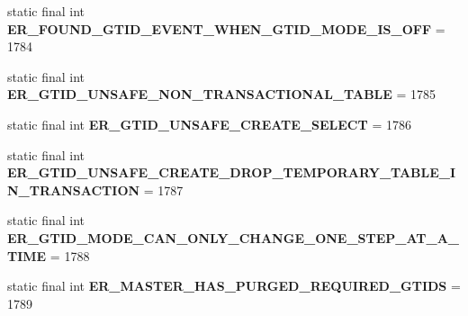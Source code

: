 \begin{DoxyCompactItemize}
\item 
\mbox{\label{classcom_1_1mysql_1_1jdbc_1_1_mysql_error_numbers_ac7d387bee25693bfcc63510f4c38737a}} 
static final int {\bfseries E\+R\+\_\+\+F\+O\+U\+N\+D\+\_\+\+G\+T\+I\+D\+\_\+\+E\+V\+E\+N\+T\+\_\+\+W\+H\+E\+N\+\_\+\+G\+T\+I\+D\+\_\+\+M\+O\+D\+E\+\_\+\+I\+S\+\_\+\+O\+FF} = 1784
\item 
\mbox{\label{classcom_1_1mysql_1_1jdbc_1_1_mysql_error_numbers_a2e00e75417d2bb26513adaedd9f455ad}} 
static final int {\bfseries E\+R\+\_\+\+G\+T\+I\+D\+\_\+\+U\+N\+S\+A\+F\+E\+\_\+\+N\+O\+N\+\_\+\+T\+R\+A\+N\+S\+A\+C\+T\+I\+O\+N\+A\+L\+\_\+\+T\+A\+B\+LE} = 1785
\item 
\mbox{\label{classcom_1_1mysql_1_1jdbc_1_1_mysql_error_numbers_a946c50067b4ee62c8fbe7a09bc0f490a}} 
static final int {\bfseries E\+R\+\_\+\+G\+T\+I\+D\+\_\+\+U\+N\+S\+A\+F\+E\+\_\+\+C\+R\+E\+A\+T\+E\+\_\+\+S\+E\+L\+E\+CT} = 1786
\item 
\mbox{\label{classcom_1_1mysql_1_1jdbc_1_1_mysql_error_numbers_a077d74fb9a1b9d97acba8d29aa896537}} 
static final int {\bfseries E\+R\+\_\+\+G\+T\+I\+D\+\_\+\+U\+N\+S\+A\+F\+E\+\_\+\+C\+R\+E\+A\+T\+E\+\_\+\+D\+R\+O\+P\+\_\+\+T\+E\+M\+P\+O\+R\+A\+R\+Y\+\_\+\+T\+A\+B\+L\+E\+\_\+\+I\+N\+\_\+\+T\+R\+A\+N\+S\+A\+C\+T\+I\+ON} = 1787
\item 
\mbox{\label{classcom_1_1mysql_1_1jdbc_1_1_mysql_error_numbers_acf677d42cd25d8e0ef9695b91add651a}} 
static final int {\bfseries E\+R\+\_\+\+G\+T\+I\+D\+\_\+\+M\+O\+D\+E\+\_\+\+C\+A\+N\+\_\+\+O\+N\+L\+Y\+\_\+\+C\+H\+A\+N\+G\+E\+\_\+\+O\+N\+E\+\_\+\+S\+T\+E\+P\+\_\+\+A\+T\+\_\+\+A\+\_\+\+T\+I\+ME} = 1788
\item 
\mbox{\label{classcom_1_1mysql_1_1jdbc_1_1_mysql_error_numbers_a8192d0201aa525871f3d0c6109e444b6}} 
static final int {\bfseries E\+R\+\_\+\+M\+A\+S\+T\+E\+R\+\_\+\+H\+A\+S\+\_\+\+P\+U\+R\+G\+E\+D\+\_\+\+R\+E\+Q\+U\+I\+R\+E\+D\+\_\+\+G\+T\+I\+DS} = 1789
\item 
\mbox{\label{classcom_1_1mysql_1_1jdbc_1_1_mysql_error_numbers_a71e0cebcd3a08dca33911a3eb0e3512b}} 

\end{DoxyCompactItemize}
